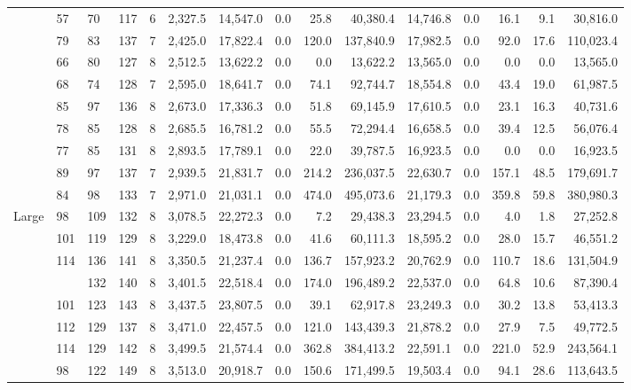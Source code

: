 \begin{table}[htb]
\begin{tabular}{lllllrrrrrrrrrr}
 & 57 & 70 & 117 & 6 & 2,327.5 & 14,547.0 & 0.0 & 25.8 & 40,380.4 & 14,746.8 & 0.0 & 16.1 & 9.1 & 30,816.0 \\
 & 79 & 83 & 137 & 7 & 2,425.0 & 17,822.4 & 0.0 & 120.0 & 137,840.9 & 17,982.5 & 0.0 & 92.0 & 17.6 & 110,023.4 \\
 & 66 & 80 & 127 & 8 & 2,512.5 & 13,622.2 & 0.0 & 0.0 & 13,622.2 & 13,565.0 & 0.0 & 0.0 & 0.0 & 13,565.0 \\
 & 68 & 74 & 128 & 7 & 2,595.0 & 18,641.7 & 0.0 & 74.1 & 92,744.7 & 18,554.8 & 0.0 & 43.4 & 19.0 & 61,987.5 \\
 & 85 & 97 & 136 & 8 & 2,673.0 & 17,336.3 & 0.0 & 51.8 & 69,145.9 & 17,610.5 & 0.0 & 23.1 & 16.3 & 40,731.6 \\
 & 78 & 85 & 128 & 8 & 2,685.5 & 16,781.2 & 0.0 & 55.5 & 72,294.4 & 16,658.5 & 0.0 & 39.4 & 12.5 & 56,076.4 \\
 & 77 & 85 & 131 & 8 & 2,893.5 & 17,789.1 & 0.0 & 22.0 & 39,787.5 & 16,923.5 & 0.0 & 0.0 & 0.0 & 16,923.5 \\
 & 89 & 97 & 137 & 7 & 2,939.5 & 21,831.7 & 0.0 & 214.2 & 236,037.5 & 22,630.7 & 0.0 & 157.1 & 48.5 & 179,691.7 \\
 & 84 & 98 & 133 & 7 & 2,971.0 & 21,031.1 & 0.0 & 474.0 & 495,073.6 & 21,179.3 & 0.0 & 359.8 & 59.8 & 380,980.3 \\
\multirow[c]{14}{*}{Large} & 98 & 109 & 132 & 8 & 3,078.5 & 22,272.3 & 0.0 & 7.2 & 29,438.3 & 23,294.5 & 0.0 & 4.0 & 1.8 & 27,252.8 \\
 & 101 & 119 & 129 & 8 & 3,229.0 & 18,473.8 & 0.0 & 41.6 & 60,111.3 & 18,595.2 & 0.0 & 28.0 & 15.7 & 46,551.2 \\
 & \multirow[c]{2}{*}{114} & 136 & 141 & 8 & 3,350.5 & 21,237.4 & 0.0 & 136.7 & 157,923.2 & 20,762.9 & 0.0 & 110.7 & 18.6 & 131,504.9 \\
 &  & 132 & 140 & 8 & 3,401.5 & 22,518.4 & 0.0 & 174.0 & 196,489.2 & 22,537.0 & 0.0 & 64.8 & 10.6 & 87,390.4 \\
 & 101 & 123 & 143 & 8 & 3,437.5 & 23,807.5 & 0.0 & 39.1 & 62,917.8 & 23,249.3 & 0.0 & 30.2 & 13.8 & 53,413.3 \\
 & 112 & 129 & 137 & 8 & 3,471.0 & 22,457.5 & 0.0 & 121.0 & 143,439.3 & 21,878.2 & 0.0 & 27.9 & 7.5 & 49,772.5 \\
 & 114 & 129 & 142 & 8 & 3,499.5 & 21,574.4 & 0.0 & 362.8 & 384,413.2 & 22,591.1 & 0.0 & 221.0 & 52.9 & 243,564.1 \\
 & \multirow[c]{2}{*}{98} & 122 & 149 & 8 & 3,513.0 & 20,918.7 & 0.0 & 150.6 & 171,499.5 & 19,503.4 & 0.0 & 94.1 & 28.6 & 113,643.5 \\

\end{tabular}
\end{table}
